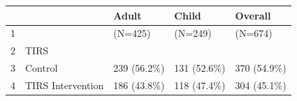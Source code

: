 \begin{table}[ht]
\centering
\begin{tabular}{rllll}
  \hline
 &   & Adult & Child & Overall \\ 
  \hline
1 &  & (N=425) & (N=249) & (N=674) \\ 
  2 & TIRS &  &  &  \\ 
  3 &   Control & 239 (56.2\%) & 131 (52.6\%) & 370 (54.9\%) \\ 
  4 &   TIRS Intervention & 186 (43.8\%) & 118 (47.4\%) & 304 (45.1\%) \\ 
   \hline
\end{tabular}
\end{table}
